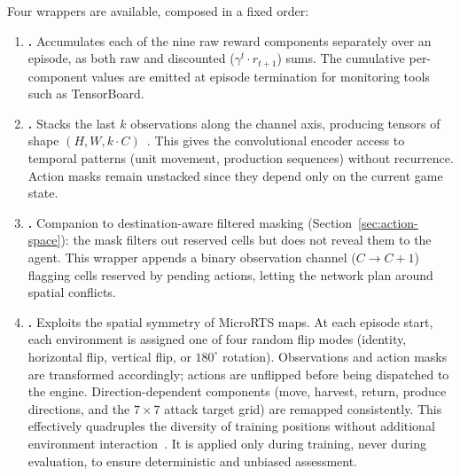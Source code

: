 Four wrappers are available, composed in a fixed order:
\begin{enumerate}
    \item \textbf{.} Accumulates each of the nine raw reward components separately over an episode, as both raw and discounted ($\gamma^t \cdot r_{t+1}$) sums. The cumulative per-component values are emitted at episode termination for monitoring tools such as TensorBoard.
    
    \item \textbf{.} Stacks the last $k$ observations along the channel axis, producing tensors of shape $(H, W, k \cdot C)$~\cite{mnihHumanlevelControlDeep2015}. This gives the convolutional encoder access to temporal patterns (unit movement, production sequences) without recurrence. Action masks remain unstacked since they depend only on the current game state.
    
    \item \textbf{.} Companion to destination-aware filtered masking (Section~\ref{sec:action-space}): the mask filters out reserved cells but does not reveal them to the agent. This wrapper appends a binary observation channel ($C \to C + 1$) flagging cells reserved by pending actions, letting the network plan around spatial conflicts.
    
    \item \textbf{.} Exploits the spatial symmetry of MicroRTS maps. At each episode start, each environment is assigned one of four random flip modes (identity, horizontal flip, vertical flip, or $180^\circ$ rotation). Observations and action masks are transformed accordingly; actions are unflipped before being dispatched to the engine. Direction-dependent components (move, harvest, return, produce directions, and the $7{\times}7$ attack target grid) are remapped consistently. This effectively quadruples the diversity of training positions without additional environment interaction~\cite{laskinReinforcementLearningAugmented2020}. It is applied only during training, never during evaluation, to ensure deterministic and unbiased assessment.
\end{enumerate}